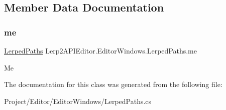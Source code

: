 \subsection{Member Data Documentation}
\mbox{\label{class_lerp2_a_p_i_editor_1_1_editor_windows_1_1_lerped_paths_a1160b7dd1dd73b5d2c1fce6752f38bd0}} 
\subsubsection{\texorpdfstring{me}{me}}
{\footnotesize\ttfamily \hyperlink{class_lerp2_a_p_i_editor_1_1_editor_windows_1_1_lerped_paths}{Lerped\+Paths} Lerp2\+A\+P\+I\+Editor.\+Editor\+Windows.\+Lerped\+Paths.\+me\hspace{0.3cm}{\ttfamily [static]}}



Me 



The documentation for this class was generated from the following file\+:\begin{DoxyCompactItemize}
\item 
Project/\+Editor/\+Editor\+Windows/Lerped\+Paths.\+cs\end{DoxyCompactItemize}
